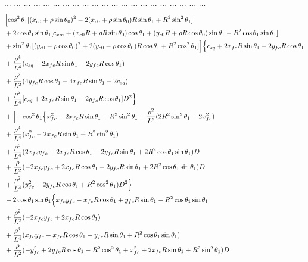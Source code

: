 \documentclass[12pt]{article}
\begin{document}
... ... ... ... ... ... ... ... ... ... ... ... ... ... ... ... ... ... ... ... ...
\begin{align}
    &\Bigl[\cos^2\theta_1[(x_{c0}+\rho\sin\theta_0)^2 -2(x_{c0}+\rho\sin\theta_0)R\sin\theta_1  +R^2\sin^2\theta_1] \nonumber\\
    &+ 2\cos\theta_1 \sin\theta_1 [ c_{xm} + (x_{c0}R + \rho R\sin\theta_0)\cos\theta_1 + (y_{c0}R + \rho R\cos\theta_0)\sin\theta_1 - R^2\cos\theta_1\sin\theta_1 ]  \nonumber\\
    &+ \sin^2\theta_1 [(y_{c0}- \rho\cos\theta_0)^2 + 2(y_{c0}- \rho\cos\theta_0)R\cos\theta_1  + R^2\cos^2\theta_1] \Bigr] \Bigl\{ c_{sq} +2x_{fc}R\sin\theta_1  -2y_{fc}R\cos\theta_1 \nonumber\\
    &+   \frac{\rho^4}{L^4} (c_{sq} + 2x_{fc}R\sin\theta_1 -2y_{fc}R\cos\theta_1) \nonumber\\
    &+ \frac{\rho^2}{L^2} ( 4y_{fc} R\cos\theta_1  - 4x_{fc} R\sin\theta_1 -2c_{sq} ) \nonumber\\
    &+\frac{\rho^2}{L^4}[ c_{sq} + 2x_{fc}R\sin\theta_1  -2y_{fc}R\cos\theta_1  ]D^2 \Bigr\} \nonumber\\
    &+ \Bigl[ -\cos^2\theta_1 \Bigl\{ x_{fc}^2 +2x_{fc}R\sin\theta_1 + R^2\sin^2\theta_1 + \frac{\rho^2}{L^2}(2R^2\sin^2\theta_1 -2x_{fc}^2)  \nonumber\\
    &+ \frac{\rho^4}{L^4}(x_{fc}^2 - 2x_{fc}R\sin\theta_1 + R^2\sin^2\theta_1) \nonumber\\
    &+ \frac{\rho^3}{L^4}(2x_{fc}y_{fc} -2x_{fc}R\cos\theta_1  -2y_{fc}R\sin\theta_1 +2R^2\cos\theta_1\sin\theta_1)D  \nonumber\\
    &+ \frac{\rho}{L^2}(-2x_{fc}y_{fc} +2x_{fc}R\cos\theta_1 -2y_{fc}R\sin\theta_1 +2R^2\cos\theta_1\sin\theta_1)D  \nonumber\\
    &+ \frac{\rho^2}{L^4}(y_{fc}^2 -2y_{fc}R\cos\theta_1 +R^2\cos^2\theta_1)D^2 \Bigr\}  \nonumber\\
    &- 2\cos\theta_1 \sin\theta_1 \Bigl\{ x_{fc}y_{fc} -x_{fc}R\cos\theta_1 + y_{fc}R\sin\theta_1 -R^2\cos\theta_1\sin\theta_1 \nonumber\\
    &+ \frac{\rho^2}{L^2}(-2x_{fc}y_{fc} +2x_{fc}R\cos\theta_1) \nonumber\\
    &+ \frac{\rho^4}{L^4}(x_{fc}y_{fc} -x_{fc}R\cos\theta_1 -y_{fc}R\sin\theta_1 +R^2\cos\theta_1\sin\theta_1) \nonumber\\
    &+ \frac{\rho}{L^2}(-y_{fc}^2 + 2y_{fc}R\cos\theta_1 -R^2\cos^2\theta_1 + x_{fc}^2 + 2x_{fc}R\sin\theta_1 + R^2\sin^2\theta_1)D \nonumber\\

\end{align}
\end{document}
